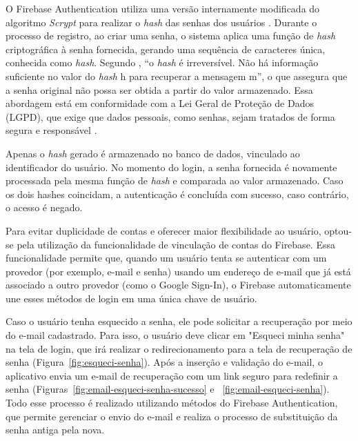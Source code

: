 O Firebase Authentication utiliza uma versão internamente modificada do algoritmo \textit{Scrypt} 
para realizar o \textit{hash} das senhas dos usuários \cite{firebaseScrypt2023}. Durante o processo de registro, 
ao criar uma senha, o sistema aplica uma função de \textit{hash} criptográfica à senha fornecida, gerando uma sequência 
de caracteres única, conhecida como \textit{hash}. Segundo , “o \textit{hash} é irreversível. Não 
há informação suficiente no valor do \textit{hash} h para recuperar a mensagem m”, o que assegura que a senha 
original não possa ser obtida a partir do valor armazenado. Essa abordagem está em conformidade com a Lei Geral 
de Proteção de Dados (LGPD), que exige que dados pessoais, como senhas, sejam tratados de 
forma segura e responsável \cite{BRASIL2018lgpd}.

Apenas o \textit{hash} gerado é armazenado no banco de dados, vinculado ao identificador do usuário. No momento do login, 
a senha fornecida é novamente processada pela mesma função de \textit{hash} e comparada ao valor armazenado. Caso os dois 
hashes coincidam, a autenticação é concluída com sucesso, caso contrário, o acesso é negado.

Para evitar duplicidade de contas e oferecer maior flexibilidade ao usuário, optou-se pela utilização da 
funcionalidade de vinculação de contas do Firebase. Essa funcionalidade permite que, 
quando um usuário tenta se autenticar com um provedor (por exemplo, e-mail e senha) usando um endereço de 
e-mail que já está associado a outro provedor (como o Google Sign-In), 
o Firebase automaticamente une esses métodos de login em uma única chave de usuário.

Caso o usuário tenha esquecido a senha, ele pode solicitar a recuperação por meio do e-mail cadastrado.
Para isso, o usuário deve clicar em "Esqueci minha senha" na tela de login, que irá realizar o 
redirecionamento para a tela de recuperação de senha (Figura~\ref{fig:esqueci-senha}). Após a inserção e validação 
do e-mail, o aplicativo envia um e-mail de recuperação com um link seguro para redefinir a senha 
(Figuras~\ref{fig:email-esqueci-senha-sucesso} e ~\ref{fig:email-esqueci-senha}). Todo esse processo 
é realizado utilizando métodos do Firebase Authentication, que permite gerenciar o envio do e-mail e realiza 
o processo de substituição da senha antiga pela nova.

